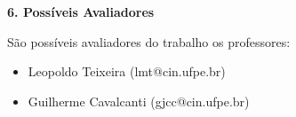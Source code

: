 \begin{flushleft}
	{\textbf{\Large{6. Possíveis Avaliadores}}}
\end{flushleft}
\vspace{2cm}

São possíveis avaliadores do trabalho os professores:
\begin{itemize}
    \item Leopoldo Teixeira (lmt@cin.ufpe.br)
    \item Guilherme Cavalcanti (gjcc@cin.ufpe.br)
\end{itemize}
